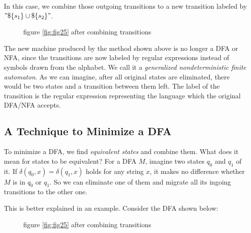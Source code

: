 \documentclass[11pt]{article}
\begin{document}
In this case, we combine those outgoing transitions to a new transition
labeled by $"\$\{s_1\}\cup\$\{s_2\}"$.

\begin{figure}[ht]
    \centering
    \caption{figure \ref{fig:fig25} after combining transitions}
    \label{fig:fig26}
\end{figure}

The new machine produced by the method shown above is no longer a DFA
or NFA, since the transitions are now labeled by regular expressions
instead of symbols drawn from the alphabet. We call it a \emph{generalized
nondeterministic finite automaton}. As we can imagine, after all original
states are eliminated, there would be two states and a transition between
them left. The label of the transition is the regular expression
representing the language which the original DFA/NFA accepts.

\subsection{A Technique to Minimize a DFA}

To minimize a DFA, we find \emph{equivalent states} and combine them.
What does it mean for states to be equivalent? For a DFA $M$, imagine
two states $q_0$ and $q_1$ of it. If $\delta(q_0, x) = \delta(q_1, x)$
holds for any string $x$, it makes no difference whether $M$ is in $q_0$
or $q_1$. So we can eliminate one of them and migrate all its ingoing
transitions to the other one.

This is better explained in an example. Consider the DFA shown below:

\begin{figure}[ht]
    \centering
    \caption{figure \ref{fig:fig25} after combining transitions}
    \label{fig:fig27}
\end{figure}
\end{document}

